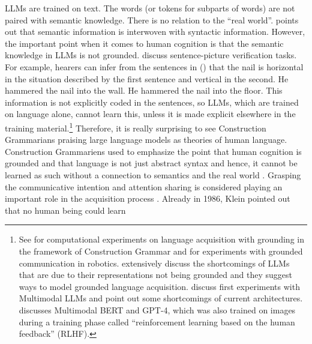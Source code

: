 LLMs are trained on text. The words (or tokens for subparts of words) are not paired with semantic
knowledge. There is no relation to the ``real world''.
\citet[358]{Piantadosi2024a} points out that semantic information is interwoven with syntactic
information. However,
the important point when it comes to human cognition is that the semantic knowledge in LLMs is not
grounded. \citet[1417]{JonesBergenTrott2024a} discuss sentence-picture verification tasks. For
example, hearers can infer from the sentences in () that the nail is horizontal in the
situation described by the first sentence and vertical in the second. 
\eal
\ex He hammered the nail into the wall.
\ex He hammered the nail into the floor.
\zl
This information is not explicitly coded in the sentences, so LLMs, which are trained on language
  alone, cannot learn this, unless it is made explicit elsewhere in the training material.\footnote{%
See \citet{CM2001a} for computational experiments on language
  acquisition with grounding in the framework of Construction Grammar and \citet{Steels2003a} for
  experiments with grounded communication in robotics. \citet{BeulsVanEcke2024a} extensively
  discuss the shortcomings of LLMs that are due to their representations not being grounded and they
  suggest ways to model grounded language acquisition. \citet{JonesBergenTrott2024a} discuss first
  experiments with Multimodal LLMs and point out some shortcomings of current architectures.
\citet[11]{Lappin2024a} discusses Multimodal BERT and GPT-4, which was also trained on images during
a training phase called ``reinforcement learning based on the human feedback'' (RLHF).%
}
Therefore, it is really surprising to see Construction Grammarians
praising large language models as theories of human language. Construction Grammariens used to
emphasize the point that human cognition is grounded
\citep{Barsalou2008a} and that language is not just abstract
syntax and hence, it cannot be learned as such without a connection to semantics and the real world
\parencites[44]{Klein86a-u}[113]{Tomasello2003a}[Section~4.2.3, 4.2.8]{AL2011a-u}{Clark2022a}. Grasping the communicative
intention and attention sharing is considered
playing an important role in the acquisition process \parencites{Tomasello2003a}[134]{AL2011a-u,Clark2022a}[234]{Goldberg2024a}. Already in 1986, Klein pointed out that no human being could learn

